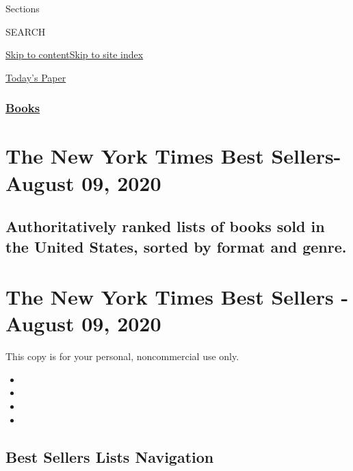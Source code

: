 Sections

SEARCH

\protect\hyperlink{site-content}{Skip to
content}\protect\hyperlink{site-index}{Skip to site index}

\href{https://myaccount.nytimes3xbfgragh.onion/auth/login?response_type=cookie\&client_id=vi}{}

\href{https://www.nytimes3xbfgragh.onion/section/todayspaper}{Today's
Paper}

\hypertarget{books}{%
\subsubsection{\texorpdfstring{\href{/section/books/}{Books}}{Books}}\label{books}}

\hypertarget{the-new-york-times-best-sellers--august-09-2020}{%
\section{The New York Times Best Sellers- August 09,
2020}\label{the-new-york-times-best-sellers--august-09-2020}}

\hypertarget{authoritatively-ranked-lists-of-books-sold-in-the-united-states-sorted-by-format-and-genre}{%
\subsection{Authoritatively ranked lists of books sold in the United
States, sorted by format and
genre.}\label{authoritatively-ranked-lists-of-books-sold-in-the-united-states-sorted-by-format-and-genre}}

\hypertarget{the-new-york-times-best-sellers---august-09-2020}{%
\section{The New York Times Best Sellers - August 09,
2020}\label{the-new-york-times-best-sellers---august-09-2020}}

This copy is for your personal, noncommercial use only.

\begin{itemize}
\item
\item
\item
\item
\end{itemize}

\hypertarget{best-sellers-lists-navigation}{%
\subsection{Best Sellers Lists
Navigation}\label{best-sellers-lists-navigation}}

